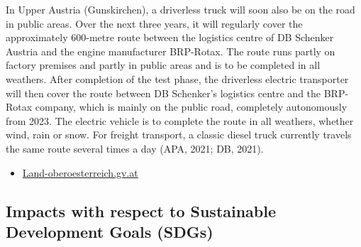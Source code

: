 \documentclass[
]{book}
\providecommand{\tightlist}{%
  \setlength{\itemsep}{0pt}\setlength{\parskip}{0pt}}
\begin{document}
In Upper Austria (Gunskirchen), a driverless truck will soon also be on the road in public areas. Over the next three years, it will regularly cover the approximately 600-metre route between the logistics centre of DB Schenker Austria and the engine manufacturer BRP-Rotax. The route runs partly on factory premises and partly in public areas and is to be completed in all weathers. After completion of the test phase, the driverless electric transporter will then cover the route between DB Schenker's logistics centre and the BRP-Rotax company, which is mainly on the public road, completely autonomously from 2023. The electric vehicle is to complete the route in all weathers, whether wind, rain or snow. For freight transport, a classic diesel truck currently travels the same route several times a day (APA, 2021; DB, 2021).

\begin{itemize}
\tightlist
\item
  \href{https://www.land-oberoesterreich.gv.at/248885.htm}{Land-oberoesterreich.gv.at}
\end{itemize}

\hypertarget{impacts-with-respect-to-sustainable-development-goals-sdgs-22}{%
\subsection*{Impacts with respect to Sustainable Development Goals (SDGs)}\label{impacts-with-respect-to-sustainable-development-goals-sdgs-22}}
\end{document}
